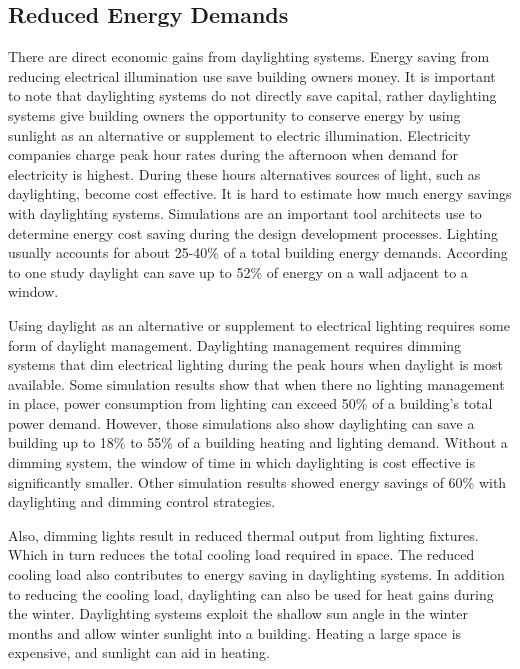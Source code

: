 \subsection{Reduced Energy Demands}
There are direct economic gains from daylighting systems. Energy saving from reducing electrical illumination use save building owners money.
It is important to note that daylighting systems do not directly save capital, rather daylighting systems give building owners the opportunity to conserve energy by using sunlight as an alternative or supplement to electric illumination. Electricity companies charge peak hour rates during the afternoon when demand for electricity is highest. During these hours alternatives sources of light, such as daylighting, become cost effective.
It is hard to estimate how much energy savings with daylighting systems. Simulations are an important tool architects use to determine energy cost saving during the design development processes.  Lighting usually accounts for about 25-40\% of a total building energy demands.
According to one study daylight can save up to 52\% of energy on a wall adjacent to a window\cite{Leslie}.

Using daylight as an alternative or supplement to electrical lighting requires some form of daylight management. Daylighting management requires dimming systems that dim electrical lighting during the peak hours when daylight is most available.  Some simulation results show that when there no lighting management in place,  power consumption from lighting can exceed 50\% of a building's total power demand.
However, those simulations also show daylighting can save a building up to 18\% to 55\% of a building heating and lighting demand\cite{Bodart}.
Without a dimming system, the window of time in which daylighting is cost effective is significantly smaller. Other simulation results showed energy savings of 60\% with daylighting and dimming control strategies\cite{Ihm}.

Also, dimming lights result in reduced thermal output from lighting fixtures. Which in turn reduces the total cooling load required in space. The reduced cooling load also contributes to energy saving in daylighting systems\cite{Leslie}. In addition to reducing the cooling load, daylighting can also be used for heat gains during the winter. Daylighting systems exploit the shallow sun angle in the winter months and allow winter sunlight into a building. Heating a large space is
expensive, and sunlight can aid in heating\cite{Bodart}.



